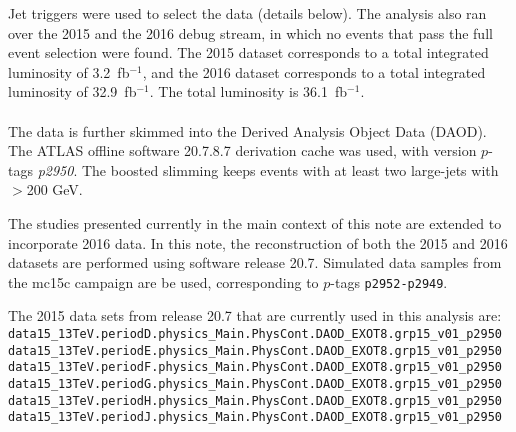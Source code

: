 Jet triggers were used to select the data (details below). The analysis also ran over the 2015 and the 2016 debug stream, in which no events that pass the full event selection were found. The 2015 dataset corresponds to a total integrated luminosity of 3.2\, fb$^{-1}$, and the 2016 dataset corresponds to a total integrated luminosity of 32.9\, fb$^{-1}$. The total luminosity is 36.1\, fb$^{-1}$.

\paragraph{}
The data is further skimmed into the Derived Analysis Object Data (DAOD). The ATLAS offline software 20.7.8.7 derivation cache was used, with version $p$-tags \textit{p2950}. The boosted slimming keeps events with at least two large-\R jets with \pt~$>$200 GeV.

The studies presented currently in the main context of this note are extended to incorporate 2016 data. In this note, the reconstruction of both the 2015 and 2016 datasets are performed using software release 20.7. Simulated data samples from the mc15c campaign are be used, corresponding to $p$-tags \texttt{p2952-p2949}.

The 2015 data sets from release 20.7 that are currently used in this analysis are:
\noindent
\\
{\scriptsize
\verb|data15_13TeV.periodD.physics_Main.PhysCont.DAOD_EXOT8.grp15_v01_p2950|\\
\verb|data15_13TeV.periodE.physics_Main.PhysCont.DAOD_EXOT8.grp15_v01_p2950|\\
\verb|data15_13TeV.periodF.physics_Main.PhysCont.DAOD_EXOT8.grp15_v01_p2950|\\
\verb|data15_13TeV.periodG.physics_Main.PhysCont.DAOD_EXOT8.grp15_v01_p2950|\\
\verb|data15_13TeV.periodH.physics_Main.PhysCont.DAOD_EXOT8.grp15_v01_p2950|\\
\verb|data15_13TeV.periodJ.physics_Main.PhysCont.DAOD_EXOT8.grp15_v01_p2950|
}

